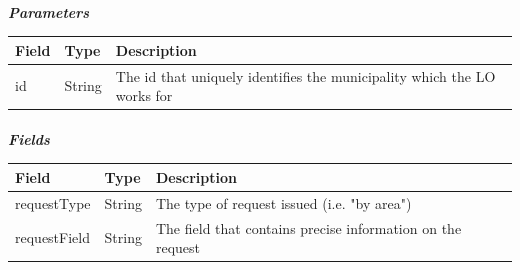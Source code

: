 						\paragraph{}
							\textcolor{myBlue}{\textit{\textbf{Parameters}}}
							\vspace{-2mm}
							\begin{table}[!h]
								\begin{tabular}{L{0.1\textwidth}L{0.15\textwidth}L{0.63\textwidth}}
									\toprule
									\textbf{Field} & \textbf{Type} & \textbf{Description} \\
									\midrule
								 	id & String & The id that uniquely identifies the municipality which the LO works for \\
								 	\bottomrule
								\end{tabular}
							\end{table}
						\vspace{-5mm}
						\paragraph{}
							\textcolor{myBlue}{\textit{\textbf{Fields}}}
							\vspace{-2mm}
							\begin{table}[!h]
								\begin{tabular}{L{0.2\textwidth}L{0.15\textwidth}L{0.53\textwidth}}
									\toprule
									\textbf{Field} & \textbf{Type} & \textbf{Description} \\
									\midrule
								 	requestType & String & The type of request issued (i.e. "by area") \\
								 	requestField & String & The field that contains precise information on the request \\
								 	\bottomrule
								\end{tabular}
							\end{table}
